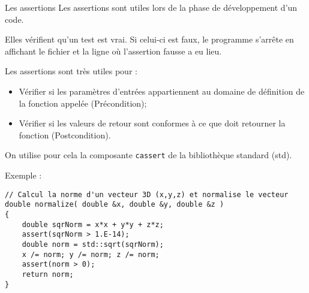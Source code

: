\documentclass[compress,10pt,aspectratio=169]{beamer}
\begin{document}
\begin{frame}[fragile]{Les assertions}
\scriptsize
Les assertions sont utiles lors de la phase de développement d'un code.

Elles vérifient qu'un test est vrai. Si celui-ci est faux, le programme s'arrête en affichant le fichier et la ligne où l'assertion
fausse a eu lieu.

Les assertions sont très utiles pour :
\begin{itemize}
\item Vérifier si les paramètres d'entrées appartiennent au domaine de définition de la fonction appelée (Précondition);
\item Vérifier si les valeurs de retour sont conformes à ce que doit retourner la fonction (Postcondition).
\end{itemize}

On utilise pour cela la composante \texttt{cassert} de la bibliothèque standard (std).

\vspace*{-2mm}
\begin{exampleblock}{\small Exemple :}
\begin{verbatim}
// Calcul la norme d'un vecteur 3D (x,y,z) et normalise le vecteur
double normalize( double &x, double &y, double &z )
{
    double sqrNorm = x*x + y*y + z*z;
    assert(sqrNorm > 1.E-14);
    double norm = std::sqrt(sqrNorm);
    x /= norm; y /= norm; z /= norm;
    assert(norm > 0);
    return norm;
}
\end{verbatim}
\end{exampleblock}
\end{frame}
\end{document}
